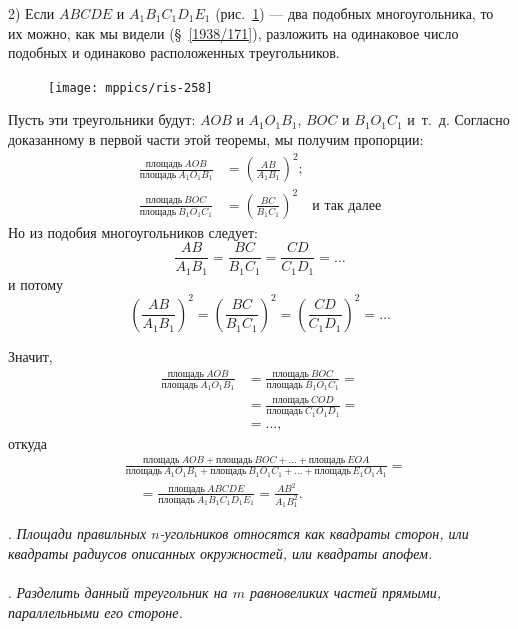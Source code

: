 \documentclass[twoside]{book}
\begin{document}
2) Если $ABCDE$ и $A_1B_1C_1D_1E_1$ (рис.~\ref{1938/ris-258}) — два подобных многоугольника, то их можно, как мы видели (§~\ref{1938/171}), разложить на одинаковое число подобных и одинаково расположенных треугольников.

\begin{figure}[h]
\centering
\texttt{[image: mppics/ris-258]}
\caption{}\label{1938/ris-258}
\end{figure}

Пусть эти треугольники будут:
$AOB$ и $A_1O_1B_1$, $BOC$ и $B_1O_1C_1$ и~т.~д.
Согласно доказанному в первой части этой теоремы, мы получим пропорции:
\begin{align*}
\frac{\text{площадь}~AOB}{\text{площадь}~A_1O_1B_1}&=\left(\frac{AB}{A_1B_1}\right)^2;
\\
\frac{\text{площадь}~BOC}{\text{площадь}~B_1O_1C_1}&=\left(\frac{BC}{B_1C_1}\right)^2\quad\text{и так далее}
\end{align*}
Но из подобия многоугольников следует:
\[\frac{AB}{A_1B_1}=\frac{BC}{B_1C_1}=\frac{CD}{C_1D_1}=\dots\]
и потому
\[\left(\frac{AB}{A_1B_1}\right)^2=\left(\frac{BC}{B_1C_1}\right)^2=\left(\frac{CD}{C_1D_1}\right)^2=\dots\]

Значит,
\begin{align*}
\frac{\text{площадь}~AOB}{\text{площадь}~A_1O_1B_1}
&=
\frac{\text{площадь}~BOC}{\text{площадь}~B_1O_1C_1}
=
\\
&=
\frac{\text{площадь}~COD}{\text{площадь}~C_1O_1D_1}=
\\
&=\dots,
\end{align*}
откуда
\begin{align*}
&\frac{\text{площадь}~AOB+\text{площадь}~BOC+\dots+\text{площадь}~EOA}{\text{площадь}\,A_1O_1B_1+\text{площадь}\,B_1O_1C_1+\dots+\text{площадь}\,E_1O_1A_1}
=
\\
&\quad=
\frac{\text{площадь}~ABCDE}{\text{площадь}~A_1B_1C_1D_1E_1}
=\frac{AB^2}{A_1B_1^2}.
\end{align*}

{\sloppy

\smallskip
{}.
\emph{Площади правильных  $n$-угольников относятся как квадраты сторон, или квадраты радиусов описанных окружностей, или квадраты апофем.}

}

\paragraph{}\label{1938/261}
.
\emph{Разделить данный треугольник на $m$ равновеликих частей прямыми, параллельными его стороне.}
\end{document}
